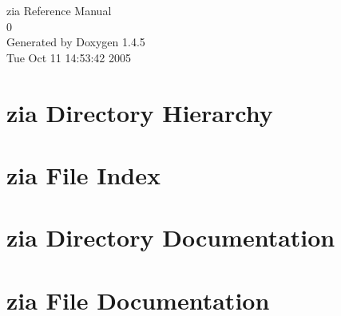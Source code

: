 \documentclass[a4paper]{book}
\begin{document}
\begin{titlepage}
\vspace*{7cm}
\begin{center}
{\Large zia Reference Manual\\[1ex]\large 0 }\\
\vspace*{1cm}
{\large Generated by Doxygen 1.4.5}\\
\vspace*{0.5cm}
{\small Tue Oct 11 14:53:42 2005}\\
\end{center}
\end{titlepage}
\clearemptydoublepage
{}
\tableofcontents
\clearemptydoublepage
{}
\chapter{zia Directory Hierarchy}

\chapter{zia File Index}

\chapter{zia Directory Documentation}


\chapter{zia File Documentation}



\printindex
\end{document}
